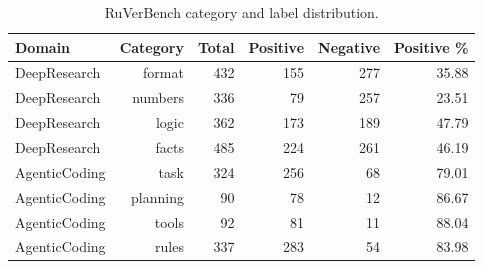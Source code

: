 \begin{table}[t]
\centering
\small
\begin{tabular}{lrrrrr}
\toprule
Domain & Category & Total & Positive & Negative & Positive \% \\
\midrule
DeepResearch & format & 432 & 155 & 277 & 35.88 \\
DeepResearch & numbers & 336 & 79 & 257 & 23.51 \\
DeepResearch & logic & 362 & 173 & 189 & 47.79 \\
DeepResearch & facts & 485 & 224 & 261 & 46.19 \\
AgenticCoding & task & 324 & 256 & 68 & 79.01 \\
AgenticCoding & planning & 90 & 78 & 12 & 86.67 \\
AgenticCoding & tools & 92 & 81 & 11 & 88.04 \\
AgenticCoding & rules & 337 & 283 & 54 & 83.98 \\
\bottomrule
\end{tabular}
\caption{RuVerBench category and label distribution.}
\label{tab:appendix-ruverbench-category-distribution}
\end{table}
